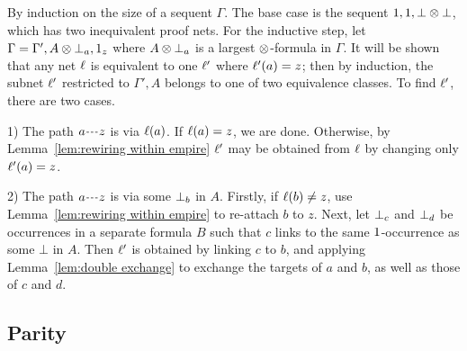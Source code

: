 \documentclass[conference]{IEEEtran}
\begin{document}
\begin{IEEEproof}
By induction on the size of a sequent $\Gamma$.
%
The base case is the sequent $1,1,\bot\otimes\bot$, which has two inequivalent proof nets.
%
For the inductive step,
%
\color{red}
let $\Gamma=\Gamma',A\otimes\bot_{a},1_{z}$ where $A\otimes\bot_{a}$ is a largest $\otimes$-formula in $\Gamma$.
%
It will be shown that any net $\ell$ is equivalent to one $\ell'$ where $\ell'(a)=z$; then by induction, the subnet $\ell'$ restricted to $\Gamma',A$ belongs to one of two equivalence classes.
%
To find $\ell'$, there are two cases.

1) The path $\path az$ is via $\ell(a)$.
%
If $\ell(a)=z$, we are done. Otherwise, by Lemma~\ref{lem:rewiring within empire} $\ell'$ may be obtained from $\ell$ by changing only $\ell'(a)=z$.


2) The path $\path az$ is via some $\bot_{b}$ in $A$.
%
Firstly, if $\ell(b)\neq z$, use Lemma~\ref{lem:rewiring within empire} to re-attach $b$ to $z$.
%
Next, let $\bot_{c}$ and $\bot_{d}$ be occurrences in a separate formula $B$ such that $c$ links to the same $1$-occurrence as some $\bot$ in $A$.
%
Then $\ell'$ is obtained by linking $c$ to $b$, and applying Lemma~\ref{lem:double exchange} to exchange the targets of $a$ and $b$, as well as those of $c$ and $d$.
%
\end{IEEEproof}
\color{black}

%
%
%



\subsection*{Parity}
\end{document}
